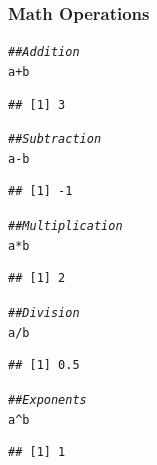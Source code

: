 \documentclass{beamer}\usepackage[]{graphicx}\usepackage[]{xcolor}
\makeatletter
\newcommand{\hlcom}[1]{\textcolor[rgb]{0.678,0.584,0.686}{\textit{#1}}}%
\newcommand{\hlopt}[1]{\textcolor[rgb]{0,0,0}{#1}}%
\newcommand{\hlstd}[1]{\textcolor[rgb]{0.345,0.345,0.345}{#1}}%
\newenvironment{kframe}{%
 \def\at@end@of@kframe{}%
 \ifinner\ifhmode%
  \def\at@end@of@kframe{\end{minipage}}%
  \begin{minipage}{\columnwidth}%
 \fi\fi%
 \def\FrameCommand##1{\hskip\@totalleftmargin \hskip-\fboxsep
 \colorbox{shadecolor}{##1}\hskip-\fboxsep
     \hskip-\linewidth \hskip-\@totalleftmargin \hskip\columnwidth}%
 \MakeFramed {\advance\hsize-\width
   \@totalleftmargin\z@ \linewidth\hsize
   \@setminipage}}%
 {\par\unskip\endMakeFramed%
 \at@end@of@kframe}
\newenvironment{knitrout}{}{} %
\makeatother
\begin{document}
\begin{frame}[fragile]\frametitle{Math Operations}
\begin{knitrout}\footnotesize
{}\color{fgcolor}\begin{kframe}
\begin{alltt}
\hlcom{## Addition}
\hlstd{a} \hlopt{+} \hlstd{b}
\end{alltt}
\begin{verbatim}
## [1] 3
\end{verbatim}
\begin{alltt}
\hlcom{## Subtraction}
\hlstd{a} \hlopt{-} \hlstd{b}
\end{alltt}
\begin{verbatim}
## [1] -1
\end{verbatim}
\begin{alltt}
\hlcom{## Multiplication}
\hlstd{a} \hlopt{*} \hlstd{b}
\end{alltt}
\begin{verbatim}
## [1] 2
\end{verbatim}
\begin{alltt}
\hlcom{## Division}
\hlstd{a} \hlopt{/} \hlstd{b}
\end{alltt}
\begin{verbatim}
## [1] 0.5
\end{verbatim}
\begin{alltt}
\hlcom{## Exponents}
\hlstd{a}\hlopt{^}\hlstd{b}
\end{alltt}
\begin{verbatim}
## [1] 1
\end{verbatim}
\end{kframe}
\end{knitrout}
\end{frame}
\end{document}
